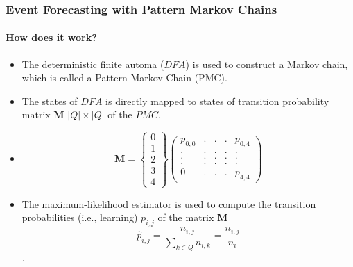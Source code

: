 \frame
{
	\frametitle{Event Forecasting with Pattern Markov
		Chains}
	\framesubtitle{How does it work?}
	\begin{itemize}
		\item<only@1> The  deterministic finite automa ($DFA$) is used to construct a Markov chain, which is called a Pattern Markov Chain (PMC).
		
		
	    \item<only@1> The states of $DFA$ is directly mapped to states of  transition probability matrix $\boldsymbol{M}$  $\lvert Q \rvert \times \lvert Q \rvert$ of the $PMC$.
		
		\item<only@1> 
	\begin{equation*}
	\label{eq:matrix_example}
	\boldsymbol{M} = 
	\begin{Bmatrix} 
	0 \\ 1 \\ 2 \\ 3 \\4
	\end{Bmatrix}
	\begin{pmatrix} 
	p_{0,0}	    &. 		&. 		& . &  	p_{0,4} \\
    . 		    & .		& .	& .	& . \\
	.		    & .		& .		& .	& . \\
	.			& .		& .		& .	& .\\
	0			& .			& .		& .	&p_{4,4}
	\end{pmatrix}
	\end{equation*}
	
	\item<only@1> The maximum-likelihood estimator is used to compute the transition probabilities (i.e., learning) $p_{i,j}$ of the matrix $\boldsymbol{M}$ 
	\begin{equation}
	\label{eq:pi_estim}
	\hat{p}_{i,j}=\frac{n_{i,j}}{\sum_{k \in Q} n_{i,k}}=\frac{n_{i,j}}{n_{i}}
	\end{equation}. 	
		
	\end{itemize}
}



